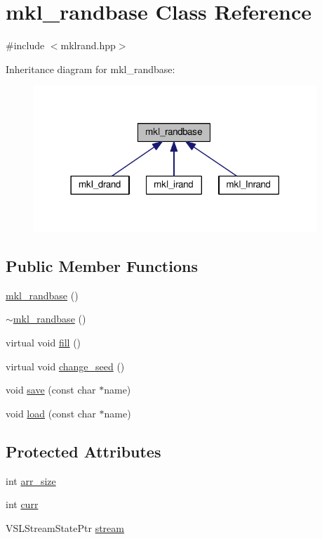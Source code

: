 \hypertarget{classmkl__randbase}{}\section{mkl\+\_\+randbase Class Reference}
\label{classmkl__randbase}


{\ttfamily \#include $<$mklrand.\+hpp$>$}



Inheritance diagram for mkl\+\_\+randbase\+:
\nopagebreak
\begin{figure}[H]
\begin{center}
\leavevmode
\includegraphics[width=302pt]{d4/dab/classmkl__randbase__inherit__graph}
\end{center}
\end{figure}
\subsection*{Public Member Functions}
\begin{DoxyCompactItemize}
\item 
\hyperlink{classmkl__randbase_a9f096a27eebdfc79087e5e8899ed98c9}{mkl\+\_\+randbase} ()
\item 
\hyperlink{classmkl__randbase_a95dd980c910854915934afead27d832e}{$\sim$mkl\+\_\+randbase} ()
\item 
virtual void \hyperlink{classmkl__randbase_ada678ebb272b395d7e2474a98bae503a}{fill} ()
\item 
virtual void \hyperlink{classmkl__randbase_af4e4fd6e13785c027f4e37fe77f4df63}{change\+\_\+seed} ()
\item 
void \hyperlink{classmkl__randbase_a62dd2d59a3b339680c2d29822e44efa5}{save} (const char $\ast$name)
\item 
void \hyperlink{classmkl__randbase_a5ebfdc1a7f661a36341d21676750e23f}{load} (const char $\ast$name)
\end{DoxyCompactItemize}
\subsection*{Protected Attributes}
\begin{DoxyCompactItemize}
\item 
int \hyperlink{classmkl__randbase_ae4fd17554da931b8d268f43b5c21f49b}{arr\+\_\+size}
\item 
int \hyperlink{classmkl__randbase_af654ef714fc77af1d4d815956034d130}{curr}
\item 
V\+S\+L\+Stream\+State\+Ptr \hyperlink{classmkl__randbase_a130663e1e2c17ec4a7b77b3c2a6aa1d6}{stream}
\end{DoxyCompactItemize}


